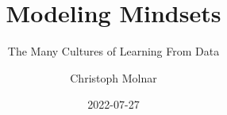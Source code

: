 \documentclass[
  10pt,
]{scrbook}
\title{Modeling Mindsets}
\subtitle{The Many Cultures of Learning From Data}
\author{Christoph Molnar}
\date{2022-07-27}
\begin{document}
\maketitle

\thispagestyle{empty}

\end{document}
